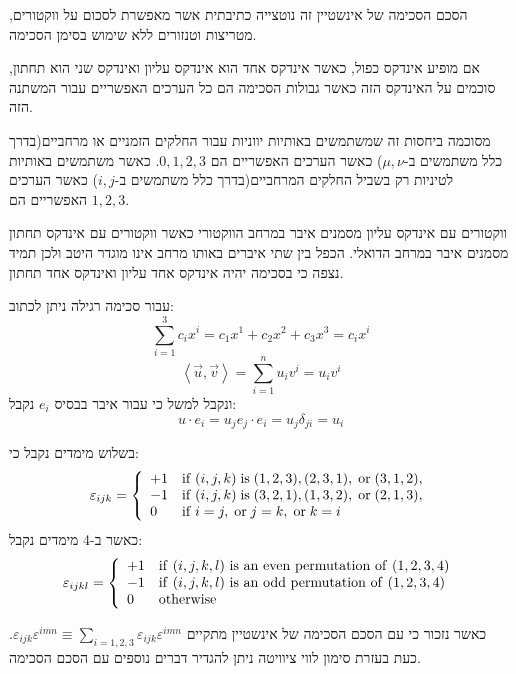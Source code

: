 \documentclass{tstextbook}
\begin{document}
הסכם הסכימה של אינשטיין זה נוטצייה כתיבתית אשר מאפשרת לסכום על ווקטורים, מטריצות וטנזורים ללא שימוש בסימן הסכימה. 

\begin{definition}
אם מופיע אינדקס כפול, כאשר אינדקס אחד הוא אינדקס עליון ואינדקס שני הוא תחתון, סוכמים על האינדקס הזה כאשר גבולות הסכימה הם כל הערכים האפשריים עבור המשתנה הזה.

\end{definition}
מסוכמה ביחסות זה שמשתמשים באותיות יווניות עבור החלקים הזמניים או מרחביים(בדרך כלל משתמשים ב-\(\mu,\nu\)) כאשר הערכים האפשריים הם \(0,1,2,3\).
כאשר משתמשים באותיות לטיניות רק בשביל החלקים המרחביים(בדרך כלל משתמשים ב-\(i,j\)) כאשר הערכים האפשריים הם \(1,2,3\).

\begin{remark}
ווקטורים עם אינדקס עליון מסמנים איבר במרחב הווקטורי כאשר ווקטורים עם אינדקס תחתון מסמנים איבר במרחב הדואלי. הכפל בין שתי איברים באותו מרחב אינו מוגדר היטב ולכן תמיד נצפה כי בסכימה יהיה אינדקס אחד עליון ואינדקס אחד תחתון.

\end{remark}
\begin{example}
עבור סכימה רגילה ניתן לכתוב:
$$\sum_{i=1}^{3}c_{i}x^{i}=c_{1}x^{1}+c_{2}x^{2}+c_{3}x^{3}=c_{i}x^i$$$$\left\langle  \vec{u},\vec{v}  \right\rangle =\sum_{i=1}^{n}u_{i}v^{i}=u_{i}v^{i}$$
ונקבל למשל כי עבור איבר בבסיס \(e_{i}\) נקבל:
$$u\cdot e_{i}=u_{j}e_{j}\cdot e_{i}=u_{j}\delta_{ji}=u_{i}$$

\end{example}
\begin{definition}
בשלוש מימדים נקבל כי:
$$\varepsilon_{i j k}={\left\{\begin{array}{l l}{+1}&{{\mathrm{if}}\;(i,j,k)\;{\mathrm{is}}\;(1,2,3),(2,3,1),\;{\mathrm{or}}\;(3,1,2),}\\ {-1}&{{\mathrm{if}}\;(i,j,k)\;{\mathrm{is}}\;(3,2,1),(1,3,2),\;{\mathrm{or}}\;(2,1,3),}\\ {0}&{{\mathrm{if}}\;i=j,\;{\mathrm{or}}\;j=k,\;{\mathrm{or}}\;k=i}\end{array}\right.}$$
כאשר ב-4 מימדים נקבל:
$$\varepsilon_{i j k l}={\left\{\begin{array}{l l}{+1}&{{\mathrm{if~}}(i,j,k,l){\mathrm{~is~an~even~permutation~of~}}(1,2,3,4)}\\ {-1}&{{\mathrm{if~}}(i,j,k,l){\mathrm{~is~an~odd~permutation~of~}}(1,2,3,4)}\\ {0}&{{\mathrm{otherwise}}}\end{array}\right.}$$

\end{definition}
כאשר נזכור כי עם הסכם הסכימה של אינשטיין מתקיים \(\varepsilon_{i j k}\varepsilon^{i m n}\equiv\sum_{i=1,2,3}\varepsilon_{i j k}\varepsilon^{i m n}\).
כעת בעזרת סימון לווי ציוויטה ניתן להגדיר דברים נוספים עם הסכם הסכימה.
\end{document}
